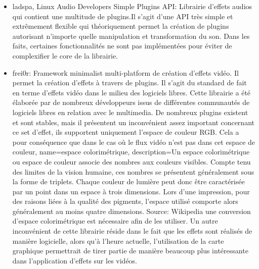 \begin{itemize}

  \item {ladspa, Linux Audio Developers Simple Plugins API: Librairie
  d'effets audios qui contient une multitude de plugins.Il s'agit d'une
  API très simple et extrêmement flexible qui théoriquement permet
  la création de plugins autorisant n'importe quelle manipulation et
  transformation du son. Dans les faits, certaines fonctionnalités
  ne sont pas implémentées pour éviter de complexifier le core de
  la librairie.}

  \item {frei0r: Framework minimalist multi-platform de création
    d'effets vidéo. Il permet la création d'effets à travers de
    plugins. Il s'agit du standard de fait en terme d'effets vidéo dans
    le milieu des logiciels libres. Cette librairie a été élaborée
    par de nombreux développeurs issus de différentes communautés
    de logiciels libres en relation avec le multimedia. De nombreux
    plugins existent et sont stables, mais il présentent un inconvénient
    assez important concernant ce set d'effet, ils supportent uniquement
    l'espace de couleur RGB. Cela a pour conséquence que dans le cas
    où le flux vidéo n'est pas dans cet espace de couleur, \glossary
    {name={espace colorimétrique}, description={Un espace colorimétrique
    ou espace de couleur associe des nombres aux couleurs visibles.
    Compte tenu des limites de la vision humaine, ces nombres se
    présentent généralement sous la forme de triplets. Chaque couleur
    de lumière peut donc être caractérisée par un point dans un
    espace à trois dimensions. Lors d'une impression, pour des raisons
    liées à la qualité des pigments, l'espace utilisé comporte alors
    généralement au moins quatre dimensions. Source: Wikipedia}}
    une conversion d'espace colorimétrique est nécessaire afin de
    les utiliser. Un autre inconvénient de cette librairie réside
    dans le fait que les effets sont réalisés de manière logicielle,
    alors qu'à l'heure actuelle, l'utilisation de la carte graphique
    permettrait de tirer partie de manière beaucoup plus intéressante
    dans l'application d'effets sur les vidéos.}

\end{itemize}

\paragraph{}

